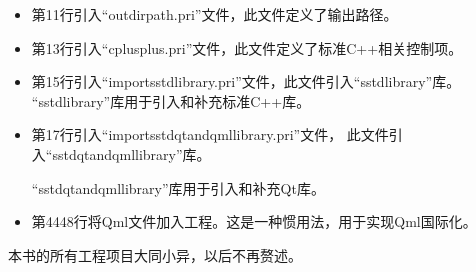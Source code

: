 \begin{itemize}
\item 第11行引入“outdirpath.pri”文件，此文件定义了输出路径。
\item 第13行引入“cplusplus.pri”文件，此文件定义了标准C{\sourcefonttwo{}+}{\sourcefonttwo{}+}相关控制项。
\item 第15行引入“import\underline{\hspace{0.5em}}sstd\underline{\hspace{0.5em}}library.pri”文件，此文件引入“sstd\underline{\hspace{0.5em}}library”库。
“sstd\underline{\hspace{0.5em}}library”库用于引入和补充标准C{\sourcefonttwo{}+}{\sourcefonttwo{}+}库。
\item 第17行引入“import\underline{\hspace{0.5em}}sstd\underline{\hspace{0.5em}}qt\underline{\hspace{0.5em}}and\underline{\hspace{0.5em}}qml\underline{\hspace{0.5em}}library.pri”文件，
此文件引入“sstd\underline{\hspace{0.5em}}\-qt\underline{\hspace{0.5em}}\-and\underline{\hspace{0.5em}}\-qml\underline{\hspace{0.5em}}\-library”库。

“sstd\underline{\hspace{0.5em}}qt\underline{\hspace{0.5em}}and\underline{\hspace{0.5em}}qml\underline{\hspace{0.5em}}library”库用于引入和补充Qt库。
\item 第44\raisebox{0.16ex}{\sourcefonttwo\~{}}48行将Qml文件加入工程。这是一种惯用法，用于实现Qml国际化。
\end{itemize}

本书的所有工程项目大同小异，以后不再赘述。

